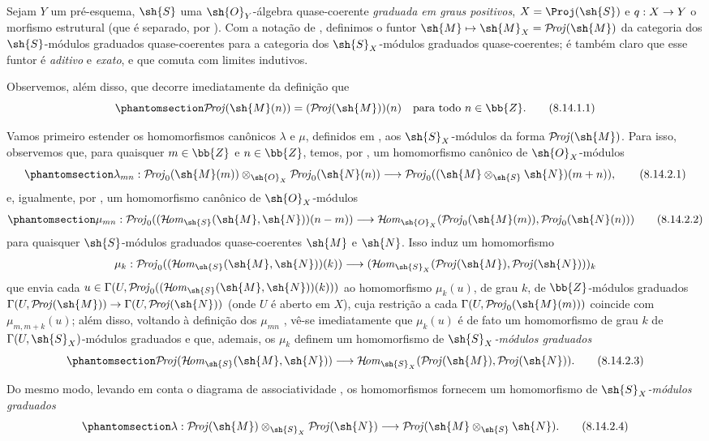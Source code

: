 \documentclass[oneside,10pt]{amsart}
\makeatletter
\newcommand{\ega@arrow}[2]{\mathchoice{#1}{#2}{#2}{#2}}
\let\ega@shortmapsto\mapsto
\renewcommand{\to}{\ega@arrow{\longrightarrow}{\rightarrow}}
\renewcommand{\mapsto}{\ega@arrow{\longmapsto}{\ega@shortmapsto}}
\def\shHom{\mathcal{H}\!\mathit{om}}
\def\shProj{\mathcal{P}\!\mathit{roj}}
\newcommand{\oldpage}[2][]{\marginnote{\normalfont\footnotesize\textbf{#1}~|~#2}\ignorespaces}
\let\EGAOriginalLabel\label
\renewcommand{\label}[1]{\phantomsection\EGAOriginalLabel{#1}}
\makeatother
\begin{document}
\begin{env}[8.14.1]
\label{II.8.14.1}
Sejam $Y$ um pré-esquema, $\sh{S}$ uma $\sh{O}_Y$-álgebra quase-coerente \emph{graduada em graus positivos}, $X=\Proj(\sh{S})$ e $q:X\to Y$ o morfismo estrutural (que é separado, por ).
Com a notação de , definimos o funtor $\sh{M}\mapsto\sh{M}_X=\shProj(\sh{M})$ da categoria dos $\sh{S}$-módulos graduados quase-coerentes para a categoria dos $\sh{S}_X$-módulos graduados quase-coerentes;
é também claro  que esse funtor é \emph{aditivo} e \emph{exato}, e que comuta com limites indutivos.

Observemos, além disso, que decorre imediatamente da definição  que
\[
\label{II.8.14.1.1}
    \shProj(\sh{M}(n)) = (\shProj(\sh{M}))(n)
    \quad\mbox{para todo $n\in\bb{Z}$.}
\tag{8.14.1.1}
\]
\end{env}

\begin{env}[8.14.2]
\label{II.8.14.2}
Vamos primeiro estender os homomorfismos canônicos $\lambda$ e $\mu$, definidos em , aos $\sh{S}_X$-módulos da forma $\shProj(\sh{M})$.
Para isso, observemos que, para quaisquer $m\in\bb{Z}$ e $n\in\bb{Z}$, temos, por , um homomorfismo canônico de $\sh{O}_X$-módulos
\[
\label{II.8.14.2.1}
    \lambda_{mn}:
    \shProj_0(\sh{M}(m))\otimes_{\sh{O}_X}\shProj_0(\sh{N}(n))
    \to
    \shProj_0((\sh{M}\otimes_{\sh{S}}\sh{N})(m+n)),
\tag{8.14.2.1}
\]
e, igualmente, por , um homomorfismo canônico de $\sh{O}_X$-módulos
\[
\label{II.8.14.2.2}
    \mu_{mn}:
    \shProj_0((\shHom_{\sh{S}}(\sh{M},\sh{N}))(n-m))
    \to
    \shHom_{\sh{O}_X}(\shProj_0(\sh{M}(m)),\shProj_0(\sh{N}(n)))
\tag{8.14.2.2}
\]
para quaisquer $\sh{S}$-módulos graduados quase-coerentes $\sh{M}$ e $\sh{N}$.
Isso induz um homomorfismo
\[
    \mu_k:
    \shProj_0((\shHom_{\sh{S}}(\sh{M},\sh{N}))(k))
    \to
    (\shHom_{\sh{S}_X}(\shProj(\sh{M}),\shProj(\sh{N})))_k
\]
que envia cada $u\in\Gamma(U,\shProj_0((\shHom_{\sh{S}}(\sh{M},\sh{N}))(k)))$ ao homomorfismo $\mu_k(u)$, de grau $k$, de $\bb{Z}$-módulos graduados $\Gamma(U,\shProj(\sh{M}))\to\Gamma(U,\shProj(\sh{N}))$ (onde $U$ é aberto em $X$), cuja restrição a cada $\Gamma(U,\shProj_0(\sh{M}(m)))$ coincide com $\mu_{m,m+k}(u)$;
além disso, voltando à definição dos $\mu_{mn}$ , vê-se imediatamente que $\mu_k(u)$ é de fato um homomorfismo de grau $k$ de $\Gamma(U,\sh{S}_X)$-módulos graduados e que, ademais, os $\mu_k$ definem um homomorfismo de \emph{$\sh{S}_X$-módulos graduados}
\[
\label{II.8.14.2.3}
    \shProj(\shHom_{\sh{S}}(\sh{M},\sh{N}))
    \to
    \shHom_{\sh{S}_X}(\shProj(\sh{M}),\shProj(\sh{N})).
\tag{8.14.2.3}
\]

Do mesmo modo, levando em conta o diagrama de associatividade , os homomorfismos  fornecem um homomorfismo de \emph{$\sh{S}_X$-módulos graduados}
\[
\label{II.8.14.2.4}
    \lambda:
    \shProj(\sh{M})\otimes_{\sh{S}_X}\shProj(\sh{N})
    \to
    \shProj(\sh{M}\otimes_{\sh{S}}\sh{N}).
\tag{8.14.2.4}
\]
\end{env}
\oldpage[II]{198}
\end{document}
